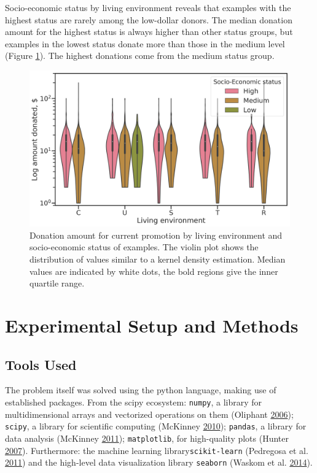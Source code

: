 \documentclass[
  11pt,
  a4paper,
  DIV=12,captions=tableheading,oneside,titlepage]{scrbook}
\begin{document}
Socio-economic status by living environment reveals that examples with the highest status are rarely among the low-dollar donors. The median donation amount for the highest status is always higher than other status groups, but examples in the lowest status donate more than those in the medium level (Figure \ref{fig:donations-le-socioec}). The highest donations come from the medium status group.



\begin{figure}

{\centering \includegraphics[width=0.7\linewidth]{figures/eda/donations-vs-living-environment-hue-socioecon} 

}

\caption{Donation amount for current promotion by living environment and socio-economic status of examples. The violin plot shows the distribution of values similar to a kernel density estimation. Median values are indicated by white dots, the bold regions give the inner quartile range.}\label{fig:donations-le-socioec}
\end{figure}

\hypertarget{experimental-setup-and-methods}{%
\chapter{Experimental Setup and Methods}\label{experimental-setup-and-methods}}

\hypertarget{tools-used}{%
\section{Tools Used}\label{tools-used}}

The problem itself was solved using the python language, making use of established packages. From the scipy ecosystem: \texttt{numpy}, a library for multidimensional arrays and vectorized operations on them (Oliphant \protect\hyperlink{ref-oliphant2006guide}{2006}); \texttt{scipy}, a library for scientific computing (McKinney \protect\hyperlink{ref-mckinney-proc-scipy-2010}{2010}); \texttt{pandas}, a library for data analysis (McKinney \protect\hyperlink{ref-mckinney2011pandas}{2011}); \texttt{matplotlib}, for high-quality plots (Hunter \protect\hyperlink{ref-hunter2007matplotlib}{2007}). Furthermore: the machine learning library\texttt{scikit-learn} (Pedregosa et al. \protect\hyperlink{ref-scikit-learn}{2011}) and the high-level data visualization library \texttt{seaborn} (Waskom et al. \protect\hyperlink{ref-waskom2014seaborn}{2014}).
\end{document}
